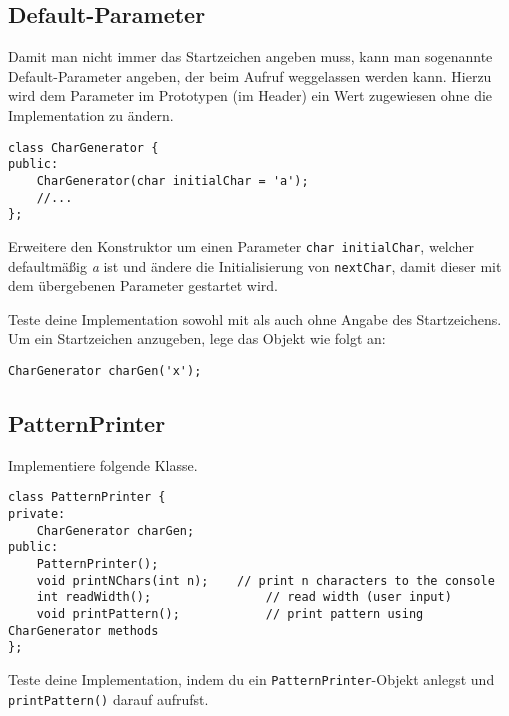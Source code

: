 \subsection{Default-Parameter}
Damit man nicht immer das Startzeichen angeben muss, kann man sogenannte Default-Parameter angeben, der beim Aufruf weggelassen werden kann.
Hierzu wird dem Parameter im Prototypen (im Header) ein Wert zugewiesen ohne die Implementation zu ändern.

\begin{lstlisting}
class CharGenerator {
public:
	CharGenerator(char initialChar = 'a');
	//...
};
\end{lstlisting}

Erweitere den Konstruktor um einen Parameter \texttt{char initialChar}, welcher defaultmäßig \emph{a} ist und ändere die Initialisierung von \texttt{nextChar}, damit dieser mit dem übergebenen Parameter gestartet wird.

Teste deine Implementation sowohl mit als auch ohne Angabe des Startzeichens.
Um ein Startzeichen anzugeben, lege das Objekt wie folgt an:

\begin{lstlisting}
CharGenerator charGen('x');
\end{lstlisting}


\subsection{PatternPrinter}
Implementiere folgende Klasse.

\begin{lstlisting}
class PatternPrinter {
private:
	CharGenerator charGen;
public:
	PatternPrinter();
	void printNChars(int n);	// print n characters to the console
	int readWidth();				// read width (user input)
	void printPattern();			// print pattern using CharGenerator methods
};
\end{lstlisting}

Teste deine Implementation, indem du ein \texttt{PatternPrinter}-Objekt anlegst und \texttt{printPattern()} darauf aufrufst.

